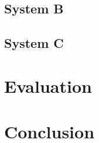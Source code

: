 \documentclass[journal]{IEEEtran}
\begin{document}
  \subsection{System B}
  \Blindtext

  \subsection{System C}
  \Blindtext

\section{Evaluation}
\Blindtext

\section{Conclusion}
\Blindtext



\end{document}
